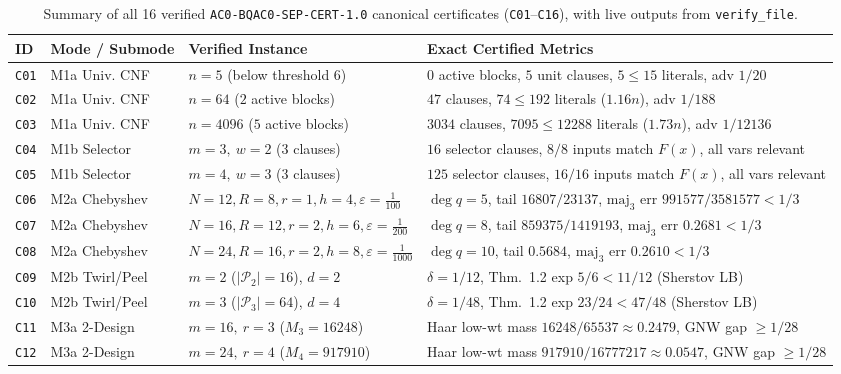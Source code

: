 \documentclass[10pt,twocolumn]{article}
\begin{document}
\begin{table}[t]
\centering
\scriptsize
\setlength{\tabcolsep}{3.6pt}
\caption{Summary of all 16 verified \texttt{AC0-BQAC0-SEP-CERT-1.0} canonical certificates (\texttt{C01}--\texttt{C16}), with live outputs from \texttt{verify\_file}.}
\label{tab:certs}
\begin{tabular}{@{}llll@{}}
\toprule
ID & Mode / Submode & Verified Instance & Exact Certified Metrics \\
\midrule
\texttt{C01} & M1a Univ. CNF & $n=5$ (below threshold $6$) & $0$ active blocks, $5$ unit clauses, $5\le 15$ literals, adv $1/20$ \\
\texttt{C02} & M1a Univ. CNF & $n=64$ ($2$ active blocks) & $47$ clauses, $74\le 192$ literals ($1.16n$), adv $1/188$ \\
\texttt{C03} & M1a Univ. CNF & $n=4096$ ($5$ active blocks) & $3034$ clauses, $7095\le 12288$ literals ($1.73n$), adv $1/12136$ \\
\texttt{C04} & M1b Selector & $m=3,\ w=2$ ($3$ clauses) & $16$ selector clauses, $8/8$ inputs match $F(x)$, all vars relevant \\
\texttt{C05} & M1b Selector & $m=4,\ w=3$ ($3$ clauses) & $125$ selector clauses, $16/16$ inputs match $F(x)$, all vars relevant \\
\texttt{C06} & M2a Chebyshev & $N=12, R=8, r=1, h=4, \varepsilon=\tfrac{1}{100}$ & $\deg q = 5$, tail $16807/23137$, $\mathrm{maj}_3$ err $991577/3581577 < 1/3$ \\
\texttt{C07} & M2a Chebyshev & $N=16, R=12, r=2, h=6, \varepsilon=\tfrac{1}{200}$ & $\deg q = 8$, tail $859375/1419193$, $\mathrm{maj}_3$ err $0.2681 < 1/3$ \\
\texttt{C08} & M2a Chebyshev & $N=24, R=16, r=2, h=8, \varepsilon=\tfrac{1}{1000}$ & $\deg q = 10$, tail $0.5684$, $\mathrm{maj}_3$ err $0.2610 < 1/3$ \\
\texttt{C09} & M2b Twirl/Peel & $m=2$ ($|\mathcal{P}_2|=16$), $d=2$ & $\delta=1/12$, Thm.~1.2 exp $5/6 < 11/12$ (Sherstov LB) \\
\texttt{C10} & M2b Twirl/Peel & $m=3$ ($|\mathcal{P}_3|=64$), $d=4$ & $\delta=1/48$, Thm.~1.2 exp $23/24 < 47/48$ (Sherstov LB) \\
\texttt{C11} & M3a 2-Design & $m=16,\ r=3$ ($M_3=16248$) & Haar low-wt mass $16248/65537\approx 0.2479$, GNW gap $\ge 1/28$ \\
\texttt{C12} & M3a 2-Design & $m=24,\ r=4$ ($M_4=917910$) & Haar low-wt mass $917910/16777217\approx 0.0547$, GNW gap $\ge 1/28$ \\

\end{tabular}
\end{table}
\end{document}

